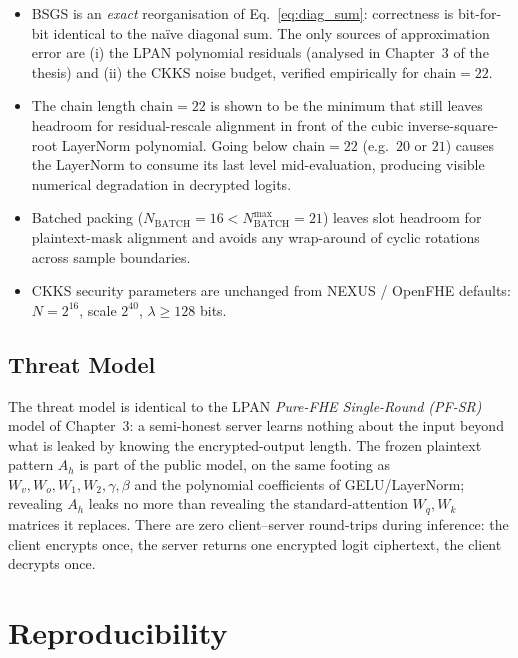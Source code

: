 \documentclass[11pt,a4paper]{article}
\newcommand{\Bbatch}{N_{\mathrm{BATCH}}}
\begin{document}
\begin{itemize}[leftmargin=2em]
  \item BSGS is an \emph{exact} reorganisation of
        Eq.~\eqref{eq:diag_sum}: correctness is bit-for-bit identical
        to the na\"ive diagonal sum.  The only sources of approximation
        error are (i) the LPAN polynomial residuals (analysed in
        Chapter~3 of the thesis) and (ii) the CKKS noise budget,
        verified empirically for $\mathrm{chain}=22$.
  \item The chain length $\mathrm{chain}=22$ is shown to be the
        minimum that still leaves headroom for residual-rescale
        alignment in front of the cubic inverse-square-root LayerNorm
        polynomial.  Going below $\mathrm{chain}=22$ (e.g.\ $20$ or
        $21$) causes the LayerNorm to consume its last level
        mid-evaluation, producing visible numerical degradation in
        decrypted logits.
  \item Batched packing
        ($\Bbatch=16 < \Bbatch^{\max}=21$) leaves slot headroom for
        plaintext-mask alignment and avoids any wrap-around of cyclic
        rotations across sample boundaries.
  \item CKKS security parameters are unchanged from NEXUS / OpenFHE
        defaults: $N = 2^{16}$, scale $2^{40}$, $\lambda \geq 128$ bits.
\end{itemize}

\subsection*{Threat Model}

The threat model is identical to the LPAN \emph{Pure-FHE Single-Round
(PF-SR)} model of Chapter~3: a semi-honest server learns nothing about
the input beyond what is leaked by knowing the encrypted-output length.
The frozen plaintext pattern $A_h$ is part of the public model, on the
same footing as $W_v, W_o, W_1, W_2, \gamma, \beta$ and the polynomial
coefficients of GELU/LayerNorm; revealing $A_h$ leaks no more than
revealing the standard-attention $W_q, W_k$ matrices it replaces.
There are zero client--server round-trips during inference: the
client encrypts once, the server returns one encrypted logit
ciphertext, the client decrypts once.

\section{Reproducibility}
\end{document}
